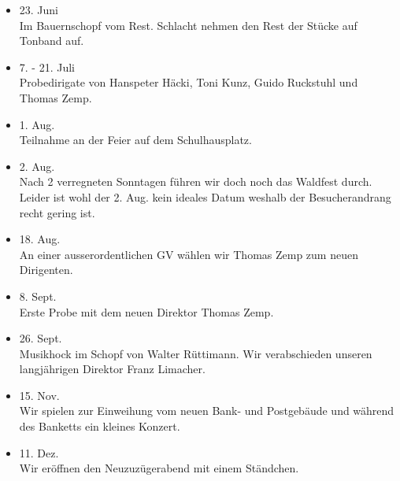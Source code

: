 \begin{multicols}{2}
\begin{itemize}
        \item[]23. Juni\\
        Im Bauernschopf vom Rest. Schlacht nehmen den Rest der Stücke auf
        Tonband auf.

        \item[]7. - 21. Juli\\
        Probedirigate von Hanspeter Häcki, Toni Kunz, Guido Ruckstuhl und Thomas
        Zemp.

        \item[]1. Aug.\\
        Teilnahme an der Feier auf dem Schulhausplatz.

        \item[]2. Aug.\\
        Nach 2 verregneten Sonntagen führen wir doch noch das Waldfest durch.
        Leider ist wohl der 2. Aug. kein ideales Datum weshalb der
        Besucherandrang recht gering ist.

        \item[]18. Aug.\\
        An einer ausserordentlichen GV wählen wir Thomas Zemp zum neuen
        Dirigenten.

        \item[]8. Sept.\\
        Erste Probe mit dem neuen Direktor Thomas Zemp.

        \item[]26. Sept.\\
        Musikhock im Schopf von Walter Rüttimann. Wir verabschieden unseren
        langjährigen Direktor Franz Limacher.

        \item[]15. Nov.\\
        Wir spielen zur Einweihung vom neuen Bank- und Postgebäude und während
        des Banketts ein kleines Konzert.

        \item[]11. Dez.\\
        Wir eröffnen den Neuzuzügerabend mit einem Ständchen.


    \end{itemize}

\end{multicols}
